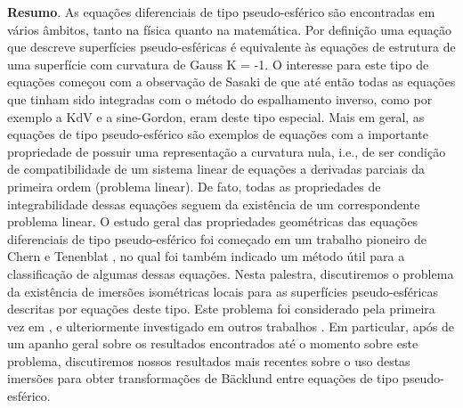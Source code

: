 	\vspace{24pt}


	
	
	\noindent\textbf{Resumo}.\label{dcf} 
	As equações diferenciais de tipo pseudo-esférico são encontradas em vários âmbitos, tanto na física quanto na matemática. Por definição uma equação que descreve superfícies pseudo-esféricas é equivalente às equações de estrutura de uma superfície com curvatura de Gauss K = -1. O interesse para este tipo de equações começou com a observação de Sasaki \cite{7} de que até então todas as equações que tinham sido integradas com o método do espalhamento inverso, como por exemplo a KdV e a sine-Gordon, eram deste tipo especial. 
	Mais em geral, as equações de tipo pseudo-esférico são exemplos de equações com a importante propriedade de possuir uma representação a curvatura nula, i.e., de ser condição de compatibilidade de um sistema linear de equações a derivadas parciais da primeira ordem (problema linear). De fato, todas as propriedades de integrabilidade dessas equações seguem da existência de um correspondente problema linear. 
	O estudo geral das propriedades geométricas das equações diferenciais de tipo pseudo-esférico foi começado em um trabalho pioneiro de Chern e Tenenblat \cite{3}, no qual foi também indicado um método útil para a classificação de algumas dessas equações. 
	Nesta palestra, discutiremos o problema da existência de imersões isométricas locais para as superfícies pseudo-esféricas descritas por equações deste tipo. Este problema foi considerado pela primeira vez em \cite{5}, e ulteriormente investigado em outros trabalhos \cite{1,2,4,6}. Em particular, após de um apanho geral sobre os resultados encontrados até o momento sobre este problema, discutiremos nossos resultados mais recentes sobre o uso destas imersões para obter transformações de Bäcklund entre equações de tipo pseudo-esférico.
	
	
	
